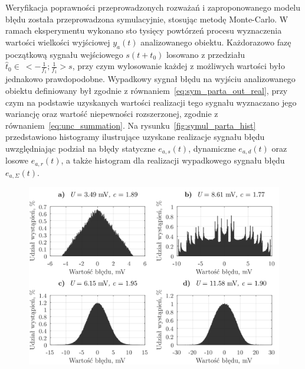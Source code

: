 Weryfikacja poprawności przeprowadzonych rozważań i zaproponowanego modelu błędu została przeprowadzona symulacyjnie, stosując metodę Monte-Carlo. W ramach eksperymentu wykonano sto tysięcy powtórzeń procesu wyznaczenia wartości wielkości wyjściowej $y_{a}(t)$ analizowanego obiektu. Każdorazowo fazę początkową sygnału wejściowego $s(t+t_{0})$ losowano z przedziału $\hat{t}_{0} \in~<-\frac{1}{f_{1}};\frac{1}{f_{1}}>\unit{s}$, przy czym wylosowanie każdej z możliwych wartości było jednakowo prawdopodobne. Wypadkowy sygnał błędu na wyjściu analizowanego obiektu definiowany był zgodnie z równaniem~\eqref{eq:sym_parta_out_real}, przy czym na podstawie uzyskanych wartości realizacji tego sygnału wyznaczano jego wariancję oraz wartość niepewności rozszerzonej, zgodnie z równaniem~\eqref{eq:unc_summation}. Na rysunku~\ref{fig:symul_parta_hist} przedstawiono histogramy ilustrujące uzyskane realizacje sygnału błędu uwzględniając podział na błędy statyczne $e_{a,s}(t)$, dynamiczne $e_{a,d}(t)$ oraz losowe $e_{a,r}(t)$, a także histogram dla realizacji wypadkowego sygnału błędu $e_{a,\Sigma}(t)$.

\begin{figure}[htb!]
\begin{center}
\includegraphics{obrazki/hist_part_a}
\end{center}
\end{figure}

